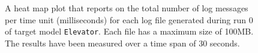 \begin{figure}[htbp]
\centering
\begin{minipage}{1\textwidth}
  \centering
\end{minipage}
\caption{A heat map plot that reports on the total number of log messages per time unit (milliseconds) for each log file generated during run 0 of target model \texttt{Elevator}. Each file has a maximum size of 100MB. The results have been measured over a time span of 30 seconds.}
\label{figure:throughput_sum_elevator_0}
\end{figure}